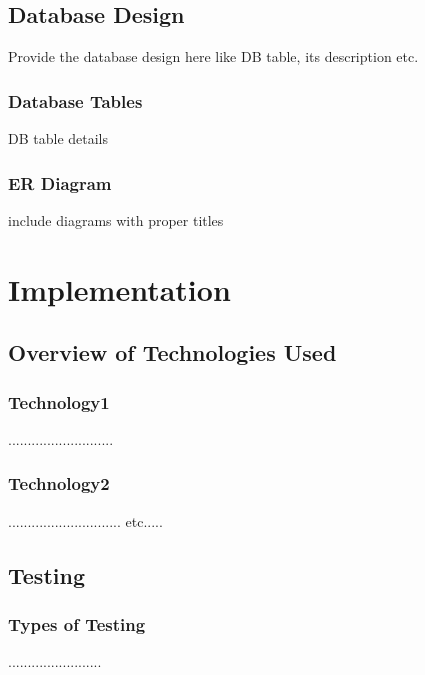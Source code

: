 \documentclass[11pt]{report}
\begin{document}

\section{Database Design}

Provide the database design here like DB table, its description etc.
\subsection{Database Tables}

DB table details

\subsection{ER Diagram}

include diagrams with proper titles



\chapter{Implementation}

\section{Overview of Technologies Used}
\subsection{Technology1}
...........................
\subsection{Technology2}
.............................
etc.....


\section{Testing}

\subsection{Types of Testing}
........................
\end{document}
